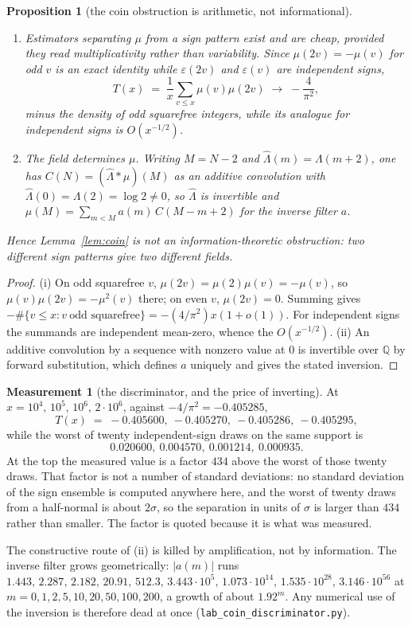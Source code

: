\documentclass[11pt,a4paper]{article}
\theoremstyle{plain}
\newtheorem{proposition}[theorem]{Proposition}
\theoremstyle{definition}
\newtheorem{measurement}[theorem]{Measurement}
\theoremstyle{remark}
\begin{document}
\begin{proposition}[the coin obstruction is arithmetic, not
informational]\label{prop:coindisc}
\begin{enumerate}
\item[(i)] Estimators separating $\mu$ from a sign pattern exist and
are cheap, provided they read \emph{multiplicativity} rather than
variability. Since $\mu(2v)=-\mu(v)$ for odd $v$ is an exact identity
while $\varepsilon(2v)$ and $\varepsilon(v)$ are independent signs,
\[
  T(x)\;=\;\frac1x\sum_{v\le x}\mu(v)\mu(2v)
  \;\longrightarrow\;-\frac{4}{\pi^2},
\]
minus the density of odd squarefree integers, while its analogue for
independent signs is $O(x^{-1/2})$.
\item[(ii)] The field determines $\mu$. Writing $M=N-2$ and
$\widehat\Lambda(m)=\Lambda(m+2)$, one has
$C(N)=(\widehat\Lambda*\mu)(M)$ as an additive convolution with
$\widehat\Lambda(0)=\Lambda(2)=\log2\neq0$, so $\widehat\Lambda$ is
invertible and $\mu(M)=\sum_{m<M}a(m)\,C(M-m+2)$ for the inverse
filter $a$.
\end{enumerate}
Hence Lemma~\ref{lem:coin} is not an information-theoretic
obstruction: two different sign patterns give two different fields.
\end{proposition}

\begin{proof}
(i) On odd squarefree $v$, $\mu(2v)=\mu(2)\mu(v)=-\mu(v)$, so
$\mu(v)\mu(2v)=-\mu^2(v)$ there; on even $v$, $\mu(2v)=0$. Summing
gives $-\#\{v\le x:v\ \text{odd squarefree}\}=-(4/\pi^2)x(1+o(1))$.
For independent signs the summands are independent mean-zero, whence
the $O(x^{-1/2})$. (ii) An additive convolution by a sequence with
nonzero value at $0$ is invertible over $\mathbb Q$ by forward
substitution, which defines $a$ uniquely and gives the stated
inversion.
\end{proof}

\begin{measurement}[the discriminator, and the price of inverting]%
\label{meas:disc}
At $x=10^4,\,10^5,\,10^6,\,2\cdot10^6$, against
$-4/\pi^2=-0.405285$,
\[
  T(x)\;=\;-0.405600,\ -0.405270,\ -0.405286,\ -0.405295,
\]
while the worst of twenty independent-sign draws on the same support
is
\[
  0.020600,\ 0.004570,\ 0.001214,\ 0.000935 .
\]
At the top the measured value is a factor $434$ above the worst of
those twenty draws. That factor is not a number of standard
deviations: no standard deviation of the sign ensemble is computed
anywhere here, and the worst of twenty draws from a half-normal is
about $2\sigma$, so the separation in units of $\sigma$ is larger than
$434$ rather than smaller. The factor is quoted because it is what was
measured.

The constructive route of (ii) is killed by amplification, not by
information. The inverse filter grows geometrically: $|a(m)|$ runs
$1.443,\,2.287,\,2.182,\,20.91,\,512.3,\,3.443\cdot10^{5},\,
1.073\cdot10^{14},\,1.535\cdot10^{28},\,3.146\cdot10^{56}$ at
$m=0,1,2,5,10,20,50,100,200$, a growth of about $1.92^{m}$. Any
numerical use of the inversion is therefore dead at once
(\texttt{lab\_coin\_discriminator.py}).
\end{measurement}
\end{document}

